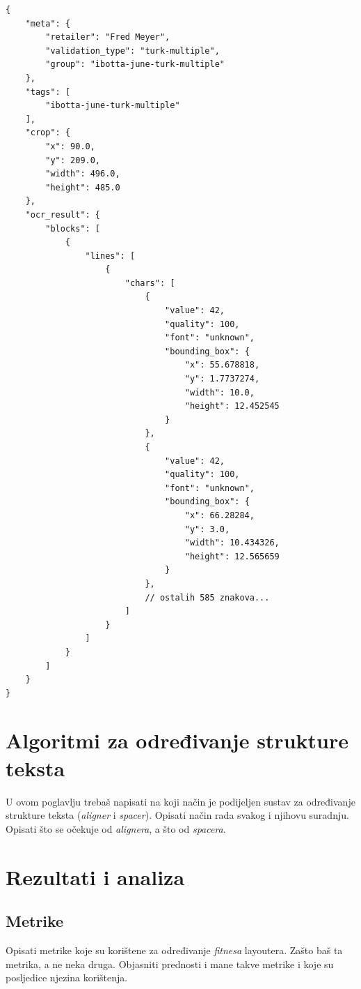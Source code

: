 \documentclass[times, utf8, zavrsni]{fer}
\begin{document}
\begin{lstlisting}[caption={JSON datoteka s podatcima o označavanju Slike \ref{fig:receipt-example-04}.},label={lst:ocr-result-json-03}]
{
    "meta": {
        "retailer": "Fred Meyer",
        "validation_type": "turk-multiple",
        "group": "ibotta-june-turk-multiple"
    },
    "tags": [
        "ibotta-june-turk-multiple"
    ],
    "crop": {
        "x": 90.0,
        "y": 209.0,
        "width": 496.0,
        "height": 485.0
    },
    "ocr_result": {
        "blocks": [
            {
                "lines": [
                    {
                        "chars": [
                            {
                                "value": 42,
                                "quality": 100,
                                "font": "unknown",
                                "bounding_box": {
                                    "x": 55.678818,
                                    "y": 1.7737274,
                                    "width": 10.0,
                                    "height": 12.452545
                                }
                            },
                            {
                                "value": 42,
                                "quality": 100,
                                "font": "unknown",
                                "bounding_box": {
                                    "x": 66.28284,
                                    "y": 3.0,
                                    "width": 10.434326,
                                    "height": 12.565659
                                }
                            },
                            // ostalih 585 znakova...
                        ]
                    }
                ]
            }
        ]
    }
}
\end{lstlisting}

\chapter{Algoritmi za određivanje strukture teksta}
U ovom poglavlju trebaš napisati na koji način je podijeljen sustav za određivanje
strukture teksta (\emph{aligner} i \emph{spacer}). Opisati način rada svakog
i njihovu suradnju. Opisati što se očekuje od \emph{alignera}, a što od \emph{spacera}.

\chapter{Rezultati i analiza}
\section{Metrike}
Opisati metrike koje su korištene za određivanje \emph{fitnesa} layoutera.
Zašto baš ta metrika, a ne neka druga. Objasniti prednosti i mane takve metrike
i koje su posljedice njezina korištenja.
\end{document}
